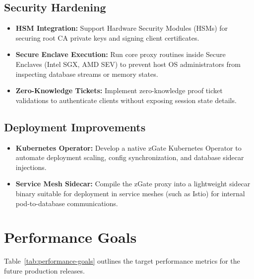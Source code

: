 \subsection{Security Hardening}

\begin{itemize}
    \item \textbf{HSM Integration:} Support Hardware Security Modules (HSMs) for securing root CA private keys and signing client certificates.
    \item \textbf{Secure Enclave Execution:} Run core proxy routines inside Secure Enclaves (Intel SGX, AMD SEV) to prevent host OS administrators from inspecting database streams or memory states.
    \item \textbf{Zero-Knowledge Tickets:} Implement zero-knowledge proof ticket validations to authenticate clients without exposing session state details.
\end{itemize}

\subsection{Deployment Improvements}

\begin{itemize}
    \item \textbf{Kubernetes Operator:} Develop a native zGate Kubernetes Operator to automate deployment scaling, config synchronization, and database sidecar injections.
    \item \textbf{Service Mesh Sidecar:} Compile the zGate proxy into a lightweight sidecar binary suitable for deployment in service meshes (such as Istio) for internal pod-to-database communications.
\end{itemize}


\section{Performance Goals}

Table~\ref{tab:performance-goals} outlines the target performance metrics for the future production releases.

